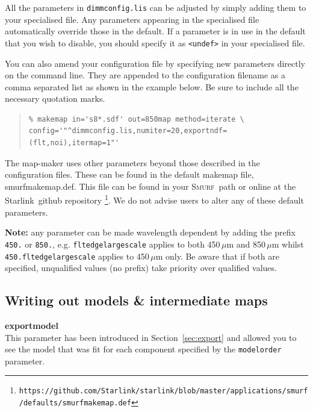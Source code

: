 \documentclass[twoside,11pt]{article}
\newcommand{\htmladdnormallink}[2]{#1}
\newcommand{\htmlref}[2]{#1}
\newcommand{\latex}[1]{#1}
\newcommand{\latexhtml}[2]{#1}
\newcommand{\xref}[3]{#1}
\newcommand{\xlabel}[1]{}
\renewcommand{\_}{\texttt{\symbol{95}}}
\newenvironment{myquote}{\begin{quote}\begin{small}}{\end{small}\end{quote}}
\newcommand{\starlink}{\htmladdnormallink{Starlink}{http://starlink.jach.hawaii.edu}}
\newcommand{\smurf}{\xref{\textsc{Smurf}}{sun258}{}}
\newcommand{\cref}[3]{\latexhtml{#1~\ref{#2}}{\htmlref{#3}{#2}}}
\begin{document}
All the parameters in \texttt{dimmconfig.lis} can be adjusted by
simply adding them to your specialised file. Any parameters appearing
in the specialised file automatically override those in the default.
If a parameter is in use in the default that you wish to disable, you
should specify it as \texttt{<undef>} in your specialised file.

You can also amend your configuration file by specifying new
parameters directly on the command line. They are appended to the
configuration filename as a comma separated list as shown in the
example below. Be sure to include all the necessary quotation marks.

\begin{myquote}
\begin{verbatim}
% makemap in='s8*.sdf' out=850map method=iterate \
config='"^dimmconfig.lis,numiter=20,exportndf=(flt,noi),itermap=1"'
\end{verbatim}
\end{myquote}

The map-maker uses other parameters beyond those described in the
configuration files. These can be found in the default makemap file,
smurf\_makemap.def. This file can be found in your \smurf\ path or
online at the \starlink\
\htmladdnormallink{github
repository}{https://github.com/Starlink/starlink/blob/master/applications/smurf/defaults/smurf\_makemap.def}
\latex{\footnote{\texttt{https://github.com/Starlink/starlink/blob/master/applications/smurf/defaults/smurf\_makemap.def}}}.
We do not advise users to alter any of these default parameters.

\textbf{Note:} any parameter can be made wavelength dependent by
adding the prefix \texttt{450.} or \texttt{850.}, e.g.
\texttt{flt\_edge\_largescale} applies to both 450\,$\mu$m and
850\,$\mu$m whilst \texttt{450.flt\_edge\_largescale} applies to
450\,$\mu$m only. Be aware that if both are specified, unqualified
values (no prefix) take priority over qualified values.

\subsection{\xlabel{inter}Writing out models \& intermediate maps}
\textbf{exportmodel}\\
This parameter has been introduced in
\cref{Section}{sec:export}{Exporting individual models} and
allowed you to see the model that was fit for each component
specified by the \texttt{modelorder} parameter.
\end{document}
